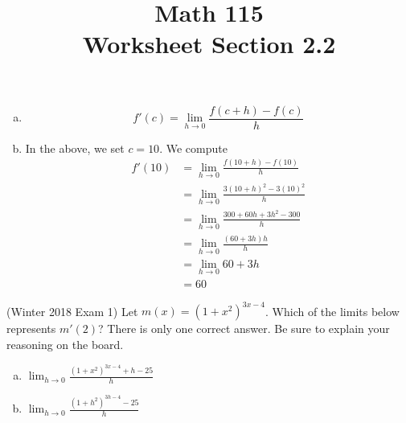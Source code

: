 \documentclass[11pt]{exam}
\title{\vspace{-0.75in} Math 115 \\ Worksheet Section 2.2}
\date{}
\begin{document}
\maketitle
\vspace{-0.75in}
\begin{questions}
\question
  \begin{solution}
    \begin{enumerate}[(a)]
    \item \[
        f'(c) = \lim_{h \to 0} \frac{f(c+h)-f(c)}{h}
      \]
    \item In the above, we set \(c=10\). We compute
      \begin{align*}
        f'(10)
        & = \lim_{h \to 0} \frac{f(10+h)-f(10)}{h} \\
        & = \lim_{h \to 0} \frac{3(10+h)^2-3(10)^2}{h}\\
        & = \lim_{h \to 0} \frac{300+60h+3h^2-300}{h}\\
        & = \lim_{h \to 0} \frac{(60+3h)h}{h}\\
        & = \lim_{h \to 0} 60+3h\\
        & = 60
      \end{align*}
    \end{enumerate}
  \end{solution}
\question (Winter 2018 Exam 1)
Let $m(x) = (1+x^2)^{3x-4}$. Which of the limits below represents
$m'(2)$? There is only one correct answer. Be sure to explain your reasoning on
the board.
\begin{multicols}{2}
\begin{enumerate}[(a)]
\item $\displaystyle\lim_{h \rightarrow 0} \frac{(1+x^2)^{3x-4} + h - 25}{h}$
\item $\displaystyle\lim_{h \rightarrow 0} \frac{(1+h^2)^{3h-4}- 25}{h}$

\end{enumerate}
\end{multicols}
\end{questions}
\end{document}
